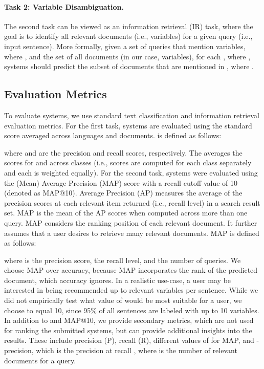 \documentclass[11pt]{article}
\begin{document}
\paragraph{Task 2: Variable Disambiguation.} The second task can be viewed as an information retrieval (IR) task, where the goal is to identify all relevant documents (i.e., variables) for a given query (i.e., input sentence).
More formally, given a set of queries  that mention variables, where , and the set of all documents  (in our case, variables), for each , where , systems should predict the subset of documents  that are mentioned in , where .

\subsection{Evaluation Metrics}
To evaluate systems, we use standard text classification and information retrieval evaluation metrics.
For the first task, systems are evaluated using the standard  score averaged across languages and documents.
 is defined as follows:

\noindent where  and  are the precision and recall scores, respectively.
The  averages the scores for  and  across classes (i.e., scores are computed for each class separately and each is weighted equally).
For the second task, systems were evaluated using the (Mean) Average Precision (MAP) score with a recall cutoff value of 10 (denoted as MAP@10).
Average Precision (AP) measures the average of the precision scores at each relevant item returned (i.e., recall level) in a search result set.
MAP is the mean of the AP scores when computed across more than one query. 
MAP considers the ranking position of each relevant document.
It further assumes that a user desires to retrieve many relevant documents.
MAP is defined as follows:

\noindent where  is the precision score,  the recall level, and  the number of queries.
We choose MAP over accuracy, because MAP incorporates the rank of the predicted document, which accuracy ignores.
In a realistic use-case, a user may be interested in being recommended up to  relevant variables per sentence.
While we did not empirically test what value of  would be most suitable for a user, we choose  to equal 10, since 95\% of all sentences are labeled with up to 10 variables.
In addition to  and MAP@10, we provide secondary metrics, which are not used for ranking the submitted systems, but can provide additional insights into the results.
These include precision (P), recall (R), different values of  for MAP, and -precision, which is the precision at recall , where  is the number of relevant documents for a query.
\end{document}
